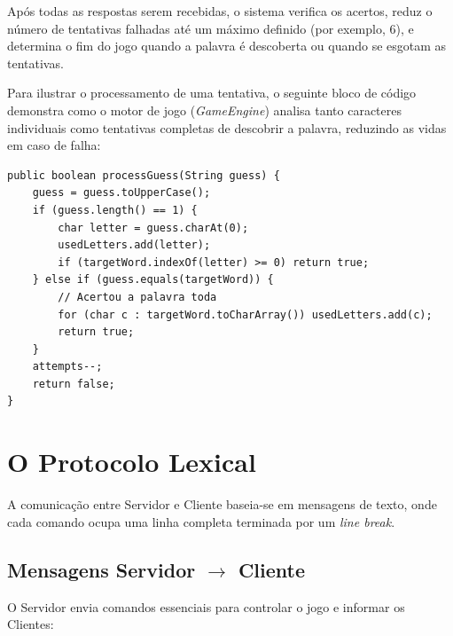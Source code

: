 \documentclass[11pt,a4paper,oneside]{report}
\begin{document}
Após todas as respostas serem recebidas, o sistema verifica os acertos, reduz o número de tentativas falhadas até um máximo definido (por exemplo, 6), e determina o fim do jogo quando a palavra é descoberta ou quando se esgotam as tentativas.

Para ilustrar o processamento de uma tentativa, o seguinte bloco de código demonstra como o motor de jogo (\textit{GameEngine}) analisa tanto caracteres individuais como tentativas completas de descobrir a palavra, reduzindo as vidas em caso de falha:

\begin{lstlisting}[caption={Processamento de palpites na classe GameEngine}]
public boolean processGuess(String guess) {
    guess = guess.toUpperCase();
    if (guess.length() == 1) {
        char letter = guess.charAt(0);
        usedLetters.add(letter);
        if (targetWord.indexOf(letter) >= 0) return true;
    } else if (guess.equals(targetWord)) {
        // Acertou a palavra toda
        for (char c : targetWord.toCharArray()) usedLetters.add(c);
        return true;
    }
    attempts--;
    return false;
}
\end{lstlisting}



\section{O Protocolo Lexical}

A comunicação entre Servidor e Cliente baseia-se em mensagens de texto, onde cada comando ocupa uma linha completa terminada por um \textit{line break}. 

\subsection{Mensagens Servidor $\rightarrow$ Cliente}
O Servidor envia comandos essenciais para controlar o jogo e informar os Clientes:
\end{document}
